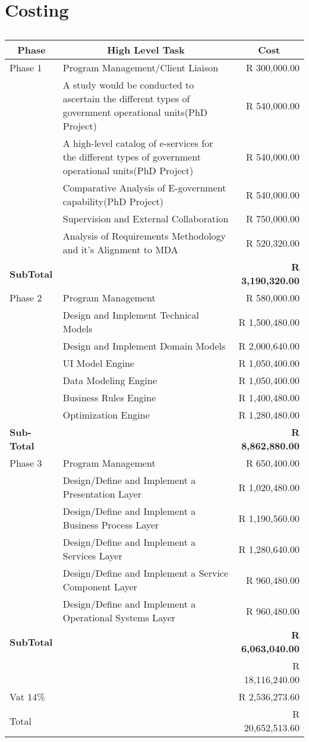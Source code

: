 \clearpage
\section{Costing}
\begin{table}[htbp]
\caption{}
\begin{tabular}{|l|p{10cm}|r|}
\hline
\multicolumn{1}{|c|}{\textbf{Phase }} & \multicolumn{1}{c|}{\textbf{High Level Task}} & \multicolumn{1}{c|}{\textbf{Cost}} \\ \hline
Phase 1 & Program Management/Client Liaison & R 300,000.00 \\ \hline
 & A study would be conducted to ascertain the different types of government operational units(PhD Project) & R 540,000.00 \\ \hline
 & A high-level catalog of e-services for the different types of government operational units(PhD Project) & R 540,000.00 \\ \hline
 & Comparative Analysis of E-government capability(PhD Project) & R 540,000.00 \\ \hline
 & Supervision and External Collaboration & R 750,000.00 \\ \hline
 & Analysis of Requirements Methodology and it's Alignment to MDA & R 520,320.00 \\ \hline
\textbf{SubTotal} & \textbf{} & \textbf{R 3,190,320.00} \\ \hline
Phase 2 & Program Management & R 580,000.00 \\ \hline
 & Design and Implement Technical Models & R 1,500,480.00 \\ \hline
 & Design and Implement Domain Models & R 2,000,640.00 \\ \hline
 & UI Model Engine & R 1,050,400.00 \\ \hline
 & Data Modeling Engine & R 1,050,400.00 \\ \hline
 & Business Rules Engine & R 1,400,480.00 \\ \hline
 & Optimization Engine & R 1,280,480.00 \\ \hline
\textbf{Sub-Total} & \textbf{} & \textbf{R 8,862,880.00} \\ \hline
Phase 3 & Program Management & R 650,400.00 \\ \hline
 & Design/Define and Implement a Presentation Layer & R 1,020,480.00 \\ \hline
 & Design/Define and Implement a Business Process Layer & R 1,190,560.00 \\ \hline
 & Design/Define and Implement a Services Layer & R 1,280,640.00 \\ \hline
 & Design/Define and Implement a Service Component Layer & R 960,480.00 \\ \hline
 & Design/Define and Implement a Operational Systems Layer & R 960,480.00 \\ \hline
\textbf{SubTotal} &  & \textbf{R 6,063,040.00} \\ \hline
 &  & R 18,116,240.00 \\ \hline
Vat 14\% &  & R 2,536,273.60 \\ \hline
Total &  & R 20,652,513.60 \\ \hline
\end{tabular}
\label{}
\end{table}
\clearpage
